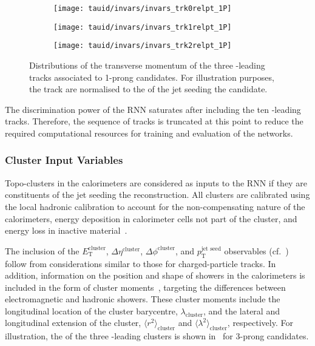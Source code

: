 \begin{figure}[htbp]
  \centering

  \begin{subfigure}{0.33\textwidth}
    \texttt{[image: tauid/invars/invars\_trk0relpt\_1P]}
    \subcaption{}%
    \label{fig:tauid_low_level_variables_track0}
  \end{subfigure}%
  \begin{subfigure}{0.33\textwidth}
    \texttt{[image: tauid/invars/invars\_trk1relpt\_1P]}
    \subcaption{}%
    \label{fig:tauid_low_level_variables_track1}
  \end{subfigure}%
  \begin{subfigure}{0.33\textwidth}
    \texttt{[image: tauid/invars/invars\_trk2relpt\_1P]}
    \subcaption{}%
    \label{fig:tauid_low_level_variables_track2}
  \end{subfigure}

  \caption{Distributions of the transverse momentum of the three
    \pT-leading tracks associated to 1-prong \tauhadvis
    candidates. For illustration purposes, the track \pT are
    normalised to the \pT of the jet seeding the \tauhadvis
    candidate.}%
  \label{fig:tauid_low_level_variables_track}
\end{figure}

The discrimination power of the RNN \tauid saturates after including
the ten \pT-leading tracks. Therefore, the sequence of tracks is
truncated at this point to reduce the required computational resources
for training and evaluation of the networks.


\subsubsection{Cluster Input Variables}

Topo-clusters in the calorimeters are considered as inputs to the RNN \tauid if
they are constituents of the jet seeding the \tauhadvis reconstruction. All
clusters are calibrated using the local hadronic calibration to account for the
non-compensating nature of the calorimeters, energy deposition in calorimeter
cells not part of the cluster, and energy loss in inactive
material~\cite{PERF-2014-07}.

The inclusion of the $E_{\text{T}}^{\text{cluster}}$,
$\Delta \eta^{\text{cluster}}$, $\Delta \phi^{\text{cluster}}$, and
$p_{\text{T}}^{\text{jet seed}}$ observables
(cf.~) follow from considerations
similar to those for charged-particle tracks. In addition, information
on the position and shape of showers in the calorimeters is included
in the form of cluster moments~\cite{PERF-2014-07}, targeting the
differences between electromagnetic and hadronic showers. These
cluster moments include the longitudinal location of the cluster
barycentre, $\lambda_{\text{cluster}}$, and the lateral and
longitudinal extension of the cluster,
$\langle r^2 \rangle_{\text{cluster}}$ and
$\langle \lambda^2 \rangle_{\text{cluster}}$, respectively. For
illustration, the \ET of the three \ET-leading clusters is shown
in~ for 3-prong \tauhadvis
candidates.

